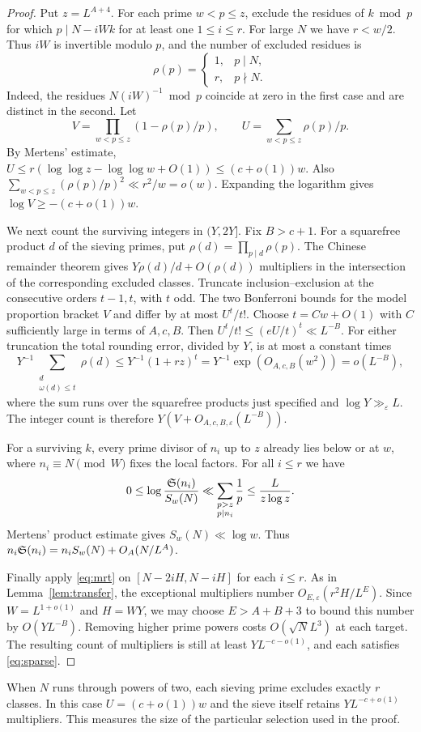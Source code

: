 \begin{proof}
Put \(z=L^{A+4}\). For each prime \(w<p\le z\), exclude the residues
of \(k\bmod p\) for which \(p\mid N-iWk\) for at least one
\(1\le i\le r\). For large \(N\) we have \(r<w/2\). Thus \(iW\) is
invertible modulo \(p\), and the number of excluded residues is
\[
 \rho(p)=
 \begin{cases}
  1,&p\mid N,\\
  r,&p\nmid N .
 \end{cases}
\]
Indeed, the residues \(N(iW)^{-1}\bmod p\) coincide at zero in the
first case and are distinct in the second. Let
\[
 V=\prod_{w<p\le z}(1-\rho(p)/p),\qquad
 U=\sum_{w<p\le z}\rho(p)/p .
\]
By Mertens' estimate,
\(U\le r(\log\log z-\log\log w+O(1))\le(c+o(1))w\).
Also \(\sum_{w<p\le z}(\rho(p)/p)^2\ll r^2/w=o(w)\). Expanding the
logarithm gives \(\log V\ge-(c+o(1))w\).

We next count the surviving integers in \((Y,2Y]\). Fix \(B>c+1\).
For a squarefree product \(d\) of the sieving primes, put
\(\rho(d)=\prod_{p\mid d}\rho(p)\). The Chinese remainder theorem gives
\(Y\rho(d)/d+O(\rho(d))\) multipliers in the intersection of the
corresponding excluded classes. Truncate inclusion--exclusion at the
consecutive orders \(t-1,t\), with \(t\) odd. The two Bonferroni bounds
for the model proportion bracket \(V\) and differ by at most
\(U^t/t!\). Choose \(t=Cw+O(1)\) with \(C\) sufficiently large in
terms of \(A,c,B\). Then \(U^t/t!\le(eU/t)^t\ll L^{-B}\).
For either truncation the total rounding error, divided by \(Y\), is
at most a constant times
\[
 Y^{-1}\!\!\sum_{\substack{d\\\omega(d)\le t}}\rho(d)
 \le Y^{-1}(1+rz)^t
 =Y^{-1}\exp(O_{A,c,B}(w^2))=o(L^{-B}),
\]
where the sum runs over the squarefree products just specified and
\(\log Y\gg_\varepsilon L\). The integer count is therefore
\(Y(V+O_{A,c,B,\varepsilon}(L^{-B}))\).

For a surviving \(k\), every prime divisor of \(n_i\) up to \(z\)
already lies below or at \(w\), where \(n_i\equiv N\pmod W\) fixes
the local factors. For all \(i\le r\) we have
\[
 0\le\log\frac{\mathfrak S(n_i)}{S_w(N)}
   \ll\sum_{\substack{p>z\\p\mid n_i}}\frac1p
   \le \frac{L}{z\log z}.
\]
Mertens' product estimate gives \(S_w(N)\ll\log w\).
Thus \(n_i\mathfrak S(n_i)=n_i S_w(N)+O_A(N/L^A)\).

Finally apply \eqref{eq:mrt} on \([N-2iH,N-iH]\) for each \(i\le r\).
As in Lemma~\ref{lem:transfer}, the exceptional multipliers number
\(O_{E,\varepsilon}(r^2H/L^E)\). Since \(W=L^{1+o(1)}\) and \(H=WY\),
we may choose \(E>A+B+3\) to bound this number by \(O(YL^{-B})\).
Removing higher prime powers costs \(O(\sqrt N L^3)\) at each target.
The resulting count of multipliers is still at least \(Y L^{-c-o(1)}\),
and each satisfies \eqref{eq:sparse}.
\end{proof}

When \(N\) runs through powers of two, each sieving prime excludes exactly
\(r\) classes. In this case \(U=(c+o(1))w\) and the sieve itself retains
\(Y L^{-c+o(1)}\) multipliers. This measures the size of the particular
selection used in the proof.
